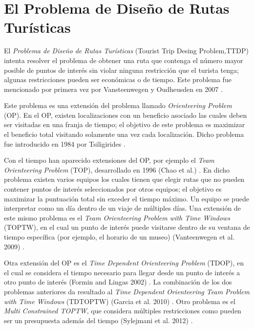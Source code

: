 \section[El Problema de Diseño de Rutas Turísticas]{El Problema de Diseño de Rutas Turísticas}
El \textit{Problema de Diseño de Rutas Turísticas} (Tourist Trip Desing Problem,TTDP) intenta resolver el problema de obtener una ruta que contenga el número mayor posible de puntos de interés sin violar ninguna restricción que el turista tenga; algunas restricciones pueden ser económicas o de tiempo. Este problema fue mencionado por primera vez por Vansteenwegen y Oudheusden en 2007 \cite{first_article_TTDP}.\newline

Este problema es una extensión del problema llamado \textit{Orienteering Problem} (OP). En el OP, existen localizaciones con un beneficio asociado las cuales deben ser visitadas en una franja de tiempo; el objetivo de este problema es maximizar el beneficio total visitando solamente una vez cada localización. Dicho problema fue introducido en 1984 por Tsiligirides \cite{first_article_OP}.\newline

Con el tiempo han aparecido extensiones del OP, por ejemplo el \textit{Team Orienteering Problem} (TOP), desarrollado en 1996 (Chao et al.) \cite{Chao}. En dicho problema existen varios equipos los cuales tienen que elegir rutas que no pueden contener puntos de interés seleccionados por otros equipos; el objetivo es maximizar la puntuación total sin exceder el tiempo máximo. Un equipo se puede interpretar como un día dentro de un viaje de múltiples días. Una extensión de este mismo problema es el \textit{Team Orienteering Problem with Time Windows} (TOPTW), en el cual un punto de interés puede visitarse  dentro de su ventana de tiempo específica (por ejemplo, el horario de un museo) (Vanteenwegen et al. 2009) \cite{TOPTW}.\newline

Otra extensión del OP es el \textit{Time Dependent Orienteering Problem} (TDOP), en el cual se considera el tiempo necesario para llegar desde un punto de interés a otro punto de interés (Formin and Lingas 2002) \cite{TDOP}. La combinación de los dos problemas anteriores da resultado al \textit{Time Dependent Orienteering Team Problem with Time Windows} (TDTOPTW) (Garcia et al. 2010) \cite{TDTOPTW}. Otro problema es el \textit{Multi Constrained TOPTW}, que considera múltiples restricciones como pueden ser un presupuesta además del tiempo (Sylejmani et al. 2012) \cite{multiconstrained_toptw}.\newline

